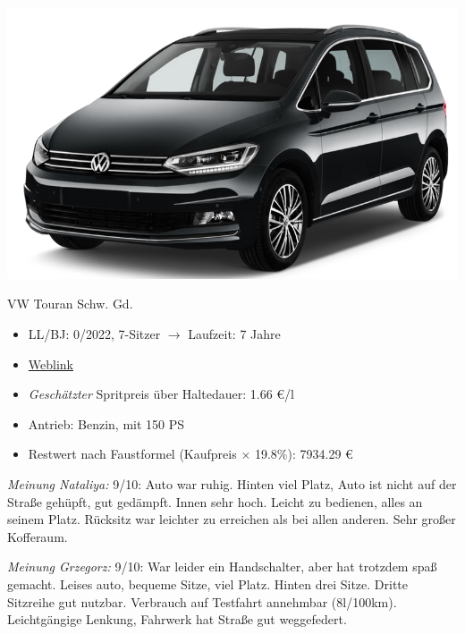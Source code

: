 \documentclass[landscape, DIV=99, 14pt]{scrartcl}
\begin{document}
\pagebreak
\begin{center}
\includegraphics[width=0.9\columnwidth]{cars/vw-touran.png}

VW Touran Schw. Gd.
\end{center}

\begin{itemize}
    \item LL/BJ: 0/2022, 7-Sitzer $\rightarrow$ Laufzeit: 7 Jahre
    \item \href{https://www.volkswagen.de/de/konfigurator.html/__app/touran/touran/comfortline.app?buildabilityStatus-app=buildable&category-app=private&carlineId-app=31000&salesGroupId-app=32600&trimName-app=Comfortline&modelId-app=5T13PZ%24GYORYOR&modelVersion-app=3&modelYear-app=2022&exteriorId-app=F14+5K5K&interiorId-app=F56+++++VE&options-app=MSTD7B2-GPG4PG4-MESSU9C-GPJ9PJ9-GPF6PF6-GPKJPKJ-GPLLPLL-MHKAKH7-GWLLWLL-GWL2WL2-GPM3PM3-GRBDRBD-MTRW3CX-MKSUKA1-MSAB4X4-GP19P19-GWQ1WQ1-GWWCWWC}{Weblink}
    \item \emph{Gesch\"atzter} Spritpreis \"uber Haltedauer: 1.66 \euro{}/l
    \item Antrieb: Benzin, mit 150 PS
    \item Restwert nach Faustformel (Kaufpreis $\times$ 19.8\%): 7934.29 \euro{}
\end{itemize}

\begin{small}
\emph{Meinung Nataliya:} 9/10: Auto war ruhig. Hinten viel Platz, Auto ist nicht auf der Straße gehüpft,
                    gut gedämpft. Innen sehr hoch. Leicht zu bedienen, alles an seinem Platz. Rücksitz
                    war leichter zu erreichen als bei allen anderen. Sehr großer Kofferaum.
        
\emph{Meinung Grzegorz:} 9/10: War leider ein Handschalter, aber hat trotzdem spaß gemacht. 
                   Leises auto, bequeme Sitze, viel Platz. Hinten drei Sitze. Dritte Sitzreihe gut nutzbar.
                   Verbrauch auf Testfahrt annehmbar (8l/100km). Leichtgängige Lenkung, Fahrwerk hat Straße 
                   gut weggefedert.
\end{small}
\end{document}
